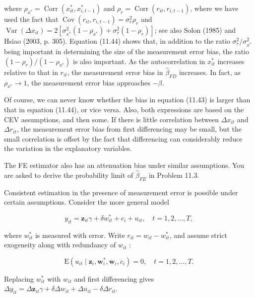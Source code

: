 \documentclass[10pt]{article}
\begin{document}
where $\rho_{x^{*}}=\operatorname{Corr}\left(x_{i t}^{*}, x_{i, t-1}^{*}\right)$ and $\rho_{r}=\operatorname{Corr}\left(r_{i t}, r_{i, t-1}\right)$, where we have used the fact that $\operatorname{Cov}\left(r_{i t}, r_{i, t-1}\right)=\sigma_{r}^{2} \rho_{r}$ and $\operatorname{Var}\left(\Delta x_{i t}\right)=2\left[\sigma_{x^{*}}^{2}\left(1-\rho_{x^{*}}\right)+\sigma_{r}^{2}\left(1-\rho_{r}\right)\right]$; see also Solon (1985) and Hsiao (2003, p. 305). Equation (11.44) shows that, in addition to the ratio $\sigma_{r}^{2} / \sigma_{x^{*}}^{2}$ being important in determining the size of the measurement error bias, the ratio $\left(1-\rho_{r}\right) /\left(1-\rho_{x^{*}}\right)$ is also important. As the autocorrelation in $x_{i t}^{*}$ increases relative to that in $r_{i t}$, the measurement error bias in $\hat{\beta}_{F D}$ increases. In fact, as $\rho_{x^{*}} \rightarrow 1$, the measurement error bias approaches $-\beta$.

Of course, we can never know whether the bias in equation (11.43) is larger than that in equation (11.44), or vice versa. Also, both expressions are based on the CEV assumptions, and then some. If there is little correlation between $\Delta x_{i t}$ and $\Delta r_{i t}$, the measurement error bias from first differencing may be small, but the small correlation is offset by the fact that differencing can considerably reduce the variation in the explanatory variables.

The FE estimator also has an attenuation bias under similar assumptions. You are asked to derive the probability limit of $\hat{\beta}_{F E}$ in Problem 11.3.

Consistent estimation in the presence of measurement error is possible under certain assumptions. Consider the more general model


\begin{equation*}
y_{i t}=\mathbf{z}_{i t} \gamma+\delta w_{i t}^{*}+c_{i}+u_{i t}, \quad t=1,2, \ldots, T, \tag{11.45}
\end{equation*}


where $w_{i t}^{*}$ is measured with error. Write $r_{i t}=w_{i t}-w_{i t}^{*}$, and assume strict exogeneity along with redundancy of $w_{i t}$ :


\begin{equation*}
\mathrm{E}\left(u_{i t} \mid \mathbf{z}_{i}, \mathbf{w}_{i}^{*}, \mathbf{w}_{i}, c_{i}\right)=0, \quad t=1,2, \ldots, T . \tag{11.46}
\end{equation*}


Replacing $w_{i t}^{*}$ with $w_{i t}$ and first differencing gives\\
$\Delta y_{i t}=\Delta \mathbf{z}_{i t} \gamma+\delta \Delta w_{i t}+\Delta u_{i t}-\delta \Delta r_{i t}$.
\end{document}
